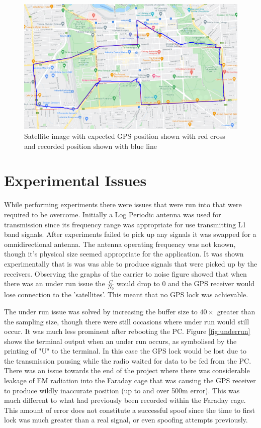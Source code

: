 \begin{figure}[H]
    \begin{centering}
        \includegraphics[width=14cm,keepaspectratio]{Figures/2021_3_30_dynamic_CBD_Satellite.PNG}
        \caption{Satellite image with expected GPS position shown with red cross and recorded position shown with blue line}
        \label{fig:CBDdynamicSatelliteImage}
    \end{centering}
\end{figure}

\section{Experimental Issues}
While performing experiments there were issues that were run into that were required to be overcome. Initially a Log Periodic antenna was used for transmission since its
frequency range was appropriate for use transmitting L1 band signals. After experiments failed to pick up any signals it was swapped for a omnidirectional antenna. The
antenna operating frequency was not known, though it's physical size seemed appropriate for the application. It was shown experimentally that is was
was able to produce signals that were picked up by the receivers. Observing the graphs of the carrier to noise figure showed that when there was an under run
issue the $\frac{C}{N_0}$ would drop to 0 and the GPS receiver would lose connection to the 'satellites'. This meant that no GPS lock was achievable.

The under run issue was solved by increasing the buffer size to $40\times$ greater than the sampling size, though there were still occasions where under run would still
occur. It was much less prominent after rebooting the PC. Figure \ref{fig:underrun} shows the terminal output when an under run occurs, as symbolised by the printing of
"U" to the terminal. In this case the GPS lock would be lost due to the transmission pausing while the radio waited for data to be fed from the PC.
There was an issue towards the end of the project where there was considerable leakage of EM radiation into the Faraday cage that was causing the GPS receiver to produce
wildly inaccurate position (up to and over 500m error). This was much different to what had previously been recorded within the Faraday cage. This amount of error does
not constitute a successful spoof since the time to first lock was much greater than a real signal, or even spoofing attempts previously. 

